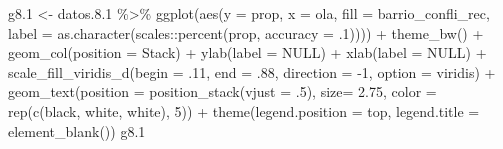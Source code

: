 \documentclass[
  12pt,
]{book}
\newenvironment{Shaded}{\begin{snugshade}}{\end{snugshade}}
\newcommand{\AttributeTok}[1]{\textcolor[rgb]{0.77,0.63,0.00}{#1}}
\newcommand{\ConstantTok}[1]{\textcolor[rgb]{0.00,0.00,0.00}{#1}}
\newcommand{\DecValTok}[1]{\textcolor[rgb]{0.00,0.00,0.81}{#1}}
\newcommand{\FloatTok}[1]{\textcolor[rgb]{0.00,0.00,0.81}{#1}}
\newcommand{\FunctionTok}[1]{\textcolor[rgb]{0.00,0.00,0.00}{#1}}
\newcommand{\NormalTok}[1]{#1}
\newcommand{\OtherTok}[1]{\textcolor[rgb]{0.56,0.35,0.01}{#1}}
\newcommand{\SpecialCharTok}[1]{\textcolor[rgb]{0.00,0.00,0.00}{#1}}
\newcommand{\StringTok}[1]{\textcolor[rgb]{0.31,0.60,0.02}{#1}}
\begin{document}
\begin{Shaded}
\begin{Highlighting}[]
\NormalTok{g8}\FloatTok{.1} \OtherTok{\textless{}{-}}\NormalTok{ datos.}\FloatTok{8.1} \SpecialCharTok{\%\textgreater{}\%} 
  \FunctionTok{ggplot}\NormalTok{(}\FunctionTok{aes}\NormalTok{(}\AttributeTok{y =}\NormalTok{ prop, }\AttributeTok{x =}\NormalTok{ ola, }\AttributeTok{fill =}\NormalTok{ barrio\_confli\_rec, }
             \AttributeTok{label =} \FunctionTok{as.character}\NormalTok{(scales}\SpecialCharTok{::}\FunctionTok{percent}\NormalTok{(prop, }\AttributeTok{accuracy =}\NormalTok{ .}\DecValTok{1}\NormalTok{)))) }\SpecialCharTok{+} 
  \FunctionTok{theme\_bw}\NormalTok{() }\SpecialCharTok{+} 
  \FunctionTok{geom\_col}\NormalTok{(}\AttributeTok{position =} \StringTok{\textquotesingle{}Stack\textquotesingle{}}\NormalTok{) }\SpecialCharTok{+}
  \FunctionTok{ylab}\NormalTok{(}\AttributeTok{label =} \ConstantTok{NULL}\NormalTok{) }\SpecialCharTok{+}
  \FunctionTok{xlab}\NormalTok{(}\AttributeTok{label =} \ConstantTok{NULL}\NormalTok{) }\SpecialCharTok{+}
  \FunctionTok{scale\_fill\_viridis\_d}\NormalTok{(}\AttributeTok{begin =}\NormalTok{ .}\DecValTok{11}\NormalTok{, }\AttributeTok{end =}\NormalTok{ .}\DecValTok{88}\NormalTok{, }\AttributeTok{direction =} \SpecialCharTok{{-}}\DecValTok{1}\NormalTok{, }\AttributeTok{option =} \StringTok{\textquotesingle{}viridis\textquotesingle{}}\NormalTok{) }\SpecialCharTok{+}
  \FunctionTok{geom\_text}\NormalTok{(}\AttributeTok{position =} \FunctionTok{position\_stack}\NormalTok{(}\AttributeTok{vjust =}\NormalTok{ .}\DecValTok{5}\NormalTok{),}
            \AttributeTok{size=} \FloatTok{2.75}\NormalTok{, }\AttributeTok{color =} \FunctionTok{rep}\NormalTok{(}\FunctionTok{c}\NormalTok{(}\StringTok{\textquotesingle{}black\textquotesingle{}}\NormalTok{, }\StringTok{\textquotesingle{}white\textquotesingle{}}\NormalTok{, }\StringTok{\textquotesingle{}white\textquotesingle{}}\NormalTok{), }\DecValTok{5}\NormalTok{)) }\SpecialCharTok{+} 
  \FunctionTok{theme}\NormalTok{(}\AttributeTok{legend.position =} \StringTok{\textquotesingle{}top\textquotesingle{}}\NormalTok{, }\AttributeTok{legend.title =} \FunctionTok{element\_blank}\NormalTok{())}
\NormalTok{g8}\FloatTok{.1}
\end{Highlighting}
\end{Shaded}
\end{document}
